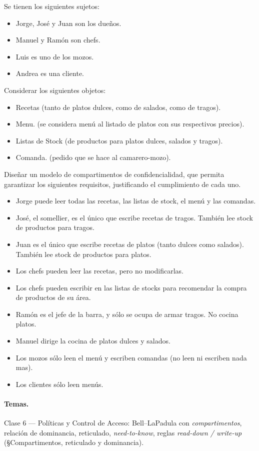 \begin{consigna}
Se tienen los siguientes sujetos:
\begin{itemize}
  \item Jorge, José y Juan son los dueños.
  \item Manuel y Ramón son chefs.
  \item Luis es uno de los mozos.
  \item Andrea es una cliente.
\end{itemize}
Considerar los siguientes objetos:
\begin{itemize}
  \item Recetas (tanto de platos dulces, como de salados, como de tragos).
  \item Menu. (se considera menú al listado de platos con sus respectivos precios).
  \item Listas de Stock (de productos para platos dulces, salados y tragos).
  \item Comanda. (pedido que se hace al camarero-mozo).
\end{itemize}
Diseñar un modelo de compartimentos de confidencialidad, que permita garantizar los siguientes requisitos, justificando el cumplimiento de cada uno.
\begin{itemize}
  \item Jorge puede leer todas las recetas, las listas de stock, el menú y las comandas.
  \item José, el somellier, es el único que escribe recetas de tragos. También lee stock de productos para tragos.
  \item Juan es el único que escribe recetas de platos (tanto dulces como salados). También lee stock de productos para platos.
  \item Los chefs pueden leer las recetas, pero no modificarlas.
  \item Los chefs pueden escribir en las listas de stocks para recomendar la compra de productos de su área.
  \item Ramón es el jefe de la barra, y sólo se ocupa de armar tragos. No cocina platos.
  \item Manuel dirige la cocina de platos dulces y salados.
  \item Los mozos sólo leen el menú y escriben comandas (no leen ni escriben nada mas).
  \item Los clientes sólo leen menús.
\end{itemize}
\end{consigna}

\paragraph{Temas.} Clase 6 — Políticas y Control de Acceso: Bell--LaPadula con
\emph{compartimentos}, relación de dominancia, reticulado, \emph{need-to-know}, reglas
\emph{read-down / write-up} (\S Compartimentos, reticulado y dominancia).

